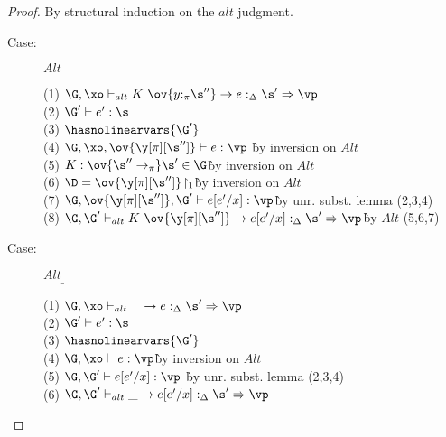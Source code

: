 \begin{proof}
By structural induction on the $alt$ judgment.

\begin{description}
\item[Case:] $Alt$
\begin{tabbing}
    (1) $\G, \xo \vdash_{alt} K~\ov{y{:}_\pi\s''} \to e :_\Delta \s' \Rightarrow \vp$\\
    (2) $\G' \vdash e' : \s$\\
    (3) $\hasnolinearvars{\G'}$\\
    (4) $\G, \xo, \ov{\y[\pi][\s'']} \vdash e : \vp$ \` by inversion on $Alt$\\
    (5) $K : \ov{\s'' \to_\pi} \s' \in \G$\` by inversion on $Alt$\\
    (6) $\D = \ov{\y[\pi][\s'']}\!\upharpoonright_1$\` by inversion on $Alt$\\
    (7) $\G,\ov{\y[\pi][\s'']},\G' \vdash e[e'/x] : \vp$\` by unr. subst. lemma (2,3,4)\\
    (8) $\G, \G' \vdash_{alt} K~\ov{\y[\pi][\s'']} \to e[e'/x] :_\Delta \s' \Rightarrow \vp$\` by $Alt$ (5,6,7)\\
\end{tabbing}

\item[Case:] $Alt_\_$
\begin{tabbing}
    (1) $\G, \xo \vdash_{alt} \_ \to e :_\Delta \s' \Rightarrow \vp$\\
    (2) $\G' \vdash e' : \s$\\
    (3) $\hasnolinearvars{\G'}$\\
    (4) $\G, \xo \vdash e : \vp$\` by inversion on $Alt_\_$\\
    (5) $\G, \G' \vdash e[e'/x] : \vp$ \` by unr. subst. lemma (2,3,4)\\
    (6) $\G ,\G' \vdash_{alt} \_ \to e[e'/x] :_\Delta \s' \Rightarrow \vp$\\
\end{tabbing}

\end{description}
\end{proof}
